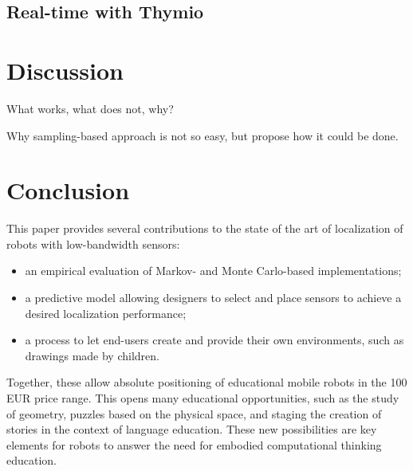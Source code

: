 \documentclass[letterpaper, 10pt, conference]{ieeeconf}
\begin{document}

\subsection{Real-time with Thymio}

\section{Discussion}

What works, what does not, why?

Why sampling-based approach is not so easy, but propose how it could be done.

\section{Conclusion}

This paper provides several contributions to the state of the art of localization of robots with low-bandwidth sensors:
\begin{itemize}
\item an empirical evaluation of Markov- and Monte Carlo-based implementations;
\item a predictive model allowing designers to select and place sensors to achieve a desired localization performance;
\item a process to let end-users create and provide their own environments, such as drawings made by children.
\end{itemize}
Together, these allow absolute positioning of educational mobile robots in the 100 EUR price range.
This opens many educational opportunities, such as the study of geometry, puzzles based on the physical space, and staging the creation of stories in the context of language education.
These new possibilities are key elements for robots to answer the need for embodied computational thinking education.



\end{document}
